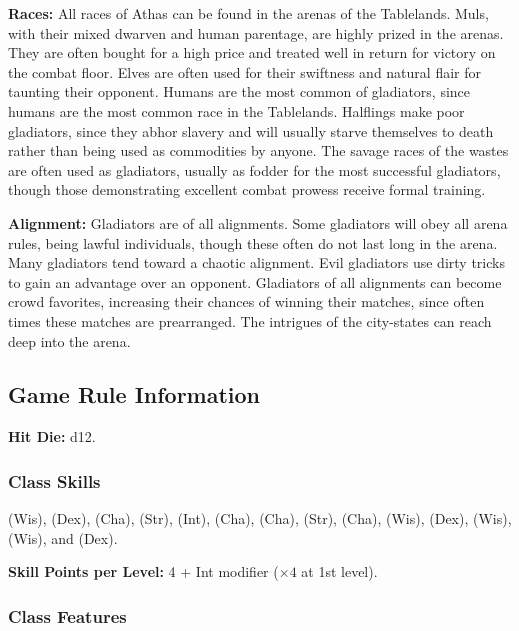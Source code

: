 \textbf{Races:} All races of Athas can be found in the arenas of the Tablelands. Muls, with their mixed dwarven and human parentage, are highly prized in the arenas. They are often bought for a high price and treated well in return for victory on the combat floor. Elves are often used for their swiftness and natural flair for taunting their opponent. Humans are the most common of gladiators, since humans are the most common race in the Tablelands. Halflings make poor gladiators, since they abhor slavery and will usually starve themselves to death rather than being used as commodities by anyone. The savage races of the wastes are often used as gladiators, usually as fodder for the most successful gladiators, though those demonstrating excellent combat prowess receive formal training.

\textbf{Alignment:} Gladiators are of all alignments. Some gladiators will obey all arena rules, being lawful individuals, though these often do not last long in the arena. Many gladiators tend toward a chaotic alignment. Evil gladiators use dirty tricks to gain an advantage over an opponent. Gladiators of all alignments can become crowd favorites, increasing their chances of winning their matches, since often times these matches are prearranged. The intrigues of the city-states can reach deep into the arena.

\subsection{Game Rule Information}

\textbf{Hit Die:} d12.

\subsubsection{Class Skills}
 (Wis),  (Dex),  (Cha),  (Str),  (Int),  (Cha),  (Cha),  (Str),  (Cha),  (Wis),  (Dex),  (Wis),  (Wis), and  (Dex).

\textbf{Skill Points per Level:} 4 + Int modifier ($\times4$ at 1st level).

\subsubsection{Class Features}

